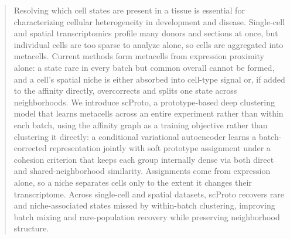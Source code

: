 \begin{abstract}
Resolving which cell states are present in a tissue is essential for characterizing cellular heterogeneity in development and disease. Single-cell and spatial transcriptomics profile many donors and sections at once, but individual cells are too sparse to analyze alone, so cells are aggregated into metacells. Current methods form metacells from expression proximity alone: a state rare in every batch but common overall cannot be formed, and a cell's spatial niche is either absorbed into cell-type signal or, if added to the affinity directly, overcorrects and splits one state across neighborhoods. We introduce scProto, a prototype-based deep clustering model that learns metacells across an entire experiment rather than within each batch, using the affinity graph as a training objective rather than clustering it directly: a conditional variational autoencoder learns a batch-corrected representation jointly with soft prototype assignment under a cohesion criterion that keeps each group internally dense via both direct and shared-neighborhood similarity. Assignments come from expression alone, so a niche separates cells only to the extent it changes their transcriptome. Across single-cell and spatial datasets, scProto recovers rare and niche-associated states missed by within-batch clustering, improving batch mixing and rare-population recovery while preserving neighborhood structure.
\end{abstract}

